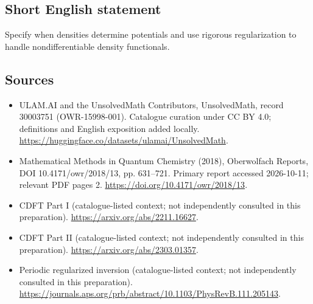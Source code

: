 \documentclass[11pt]{article}
\begin{document}
\subsection{Short English statement}
Specify when densities determine potentials and use rigorous regularization to handle nondifferentiable density functionals.
\subsection{Sources}
\begin{itemize}
\item[\hypertarget{source:30003751:1}{S1}] ULAM.AI and the UnsolvedMath Contributors, UnsolvedMath, record 30003751 (OWR-15998-001). Catalogue curation under CC BY 4.0; definitions and English exposition added locally.
\url{https://huggingface.co/datasets/ulamai/UnsolvedMath}.
\item[\hypertarget{source:30003751:2}{S2}] Mathematical Methods in Quantum Chemistry (2018), Oberwolfach Reports, DOI 10.4171/owr/2018/13, pp. 631--721. Primary report accessed 2026-10-11; relevant PDF pages 2.
\url{https://doi.org/10.4171/owr/2018/13}.
\item[\hypertarget{source:30003751:3}{S3}] CDFT Part I (catalogue-listed context; not independently consulted in this preparation).
\url{https://arxiv.org/abs/2211.16627}.
\item[\hypertarget{source:30003751:4}{S4}] CDFT Part II (catalogue-listed context; not independently consulted in this preparation).
\url{https://arxiv.org/abs/2303.01357}.
\item[\hypertarget{source:30003751:5}{S5}] Periodic regularized inversion (catalogue-listed context; not independently consulted in this preparation).
\url{https://journals.aps.org/prb/abstract/10.1103/PhysRevB.111.205143}.
\end{itemize}
\label{end:30003751}
\end{document}
